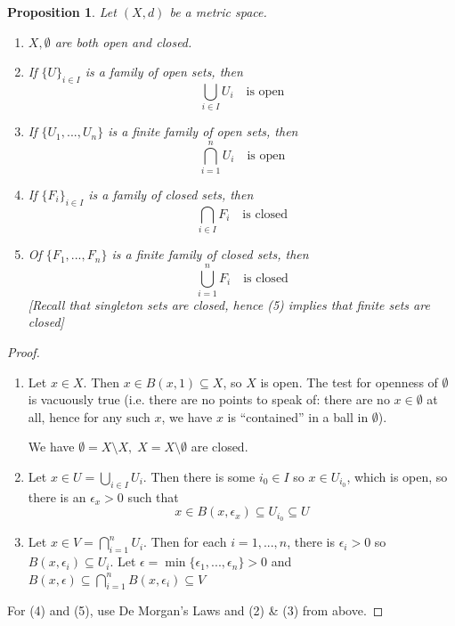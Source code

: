 \documentclass[11pt, oneside]{book}
\theoremstyle{break}
\newtheorem*{proof}{Proof}
\newtheorem{propo}{Proposition}[section]
\begin{document}
\begin{propo}
	Let $(X, d)$ be a metric space.
	\begin{enumerate}
		\item $X, \emptyset$ are both open and closed.
		\item If $\{U\}_{i \in I}$ is a family of open sets, then
			\begin{equation}
				\bigcup_{i \in I} U_i \quad \text{is open}
			\end{equation}
		\item If $\{U_1, ..., U_n\}$ is a finite family of open sets, then
			\begin{equation}
				\bigcap_{i = 1}^{n} U_i \quad \text{is open}
			\end{equation}
		\item If $\{F_i\}_{i \in I}$ is a family of closed sets, then
			\begin{equation}
				\bigcap_{i \in I} F_i \quad \text{is closed}
			\end{equation}
		\item Of $\{F_1, ..., F_n\}$ is a finite family of closed sets, then
			\begin{equation}
				\bigcup_{i = 1}^{n} F_i \quad \text{is closed}
			\end{equation}
			[Recall that singleton sets are closed, hence (5) implies that finite sets are closed]
	\end{enumerate}
\end{propo}

\begin{proof}
	\begin{enumerate}
		\item Let $x \in X$. Then $x \in B(x, 1) \subseteq X$, so $X$ is open. The test for openness of $\emptyset$ is vacuously true (i.e. there are no points to speak of: there are no $x \in \emptyset$ at all, hence for any such $x$, we have $x$ is ``contained'' in a ball in $\emptyset$).

			We have $\emptyset = X \setminus X, \; X = X \setminus \emptyset$ are closed.

		\item Let $x \in U = \bigcup_{i \in I} U_i$. Then there is some $i_0 \in I$ so $x \in U_{i_0}$, which is open, so there is an $\epsilon_x > 0$ such that
			\begin{equation}
				x \in B(x, \epsilon_x) \subseteq U_{i_0} \subseteq U
			\end{equation}

		\item Let $x \in V = \bigcap_{i = 1}^{n} U_i$. Then for each $i = 1, ..., n$, there is $\epsilon_i > 0$ so $B(x, \epsilon_i) \subseteq U_i$. Let $\epsilon = \min\{\epsilon_1, ..., \epsilon_n\} > 0$ and $B(x, \epsilon) \subseteq \bigcap_{i = 1}^{n} B(x, \epsilon_i) \subseteq V$
	\end{enumerate}

	For (4) and (5), use De Morgan's Laws and (2) \& (3) from above.
\end{proof}
\end{document}
